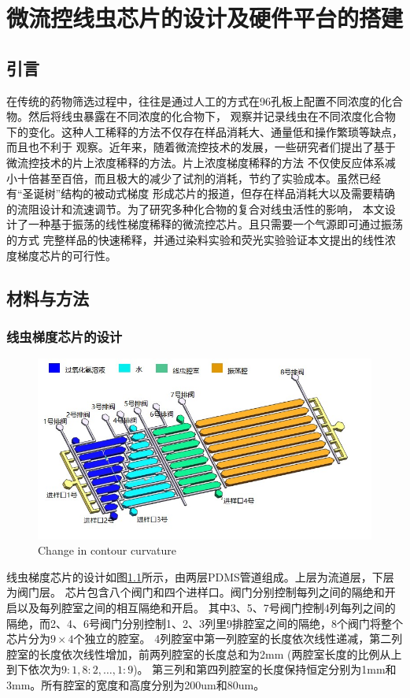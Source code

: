 \chapter{微流控线虫芯片的设计及硬件平台的搭建}
\section{引言}
	在传统的药物筛选过程中，往往是通过人工的方式在96孔板上配置不同浓度的化合物。然后将线虫暴露在不同浓度的化合物下，
	观察并记录线虫在不同浓度化合物下的变化。这种人工稀释的方法不仅存在样品消耗大、通量低和操作繁琐等缺点，而且也不利于
	观察。近年来，随着微流控技术的发展，一些研究者们提出了基于微流控技术的片上浓度稀释的方法。片上浓度梯度稀释的方法
	不仅使反应体系减小十倍甚至百倍，而且极大的减少了试剂的消耗，节约了实验成本。虽然已经有“圣诞树”结构的被动式梯度
	形成芯片的报道，但存在样品消耗大以及需要精确的流阻设计和流速调节。为了研究多种化合物的复合对线虫活性的影响，
	本文设计了一种基于振荡的线性梯度稀释的微流控芯片。且只需要一个气源即可通过振荡的方式
	完整样品的快速稀释，并通过染料实验和荧光实验验证本文提出的线性浓度梯度芯片的可行性。
	
\section{材料与方法}
\subsection{线虫梯度芯片的设计}
\label{arch-design}
\begin{figure}[htbp]
	  \centering
	  \includegraphics[width=13cm]{figure/chap2/chip-arch.jpg}
		{Change in contour curvature}
	  \label{fig:chap2:chip-arch}
	\end{figure}
线虫梯度芯片的设计如图\ref{fig:chap2:chip-arch}所示，由两层PDMS管道组成。上层为流道层，下层为阀门层。
芯片包含八个阀门和四个进样口。阀门分别控制每列之间的隔绝和开启以及每列腔室之间的相互隔绝和开启。
其中3、5、7号阀门控制4列每列之间的隔绝，而2、4、6号阀门分别控制1、2、3列里9排腔室之间的隔绝，8个阀门将整个芯片分为$9\times4$个独立的腔室。
4列腔室中第一列腔室的长度依次线性递减，第二列腔室的长度依次线性增加，前两列腔室的长度总和为2mm (两腔室长度的比例从上到下依次为$9:1,8:2,\dots,1:9$)。
第三列和第四列腔室的长度保持恒定分别为1mm和3mm。所有腔室的宽度和高度分别为200um和80um。

